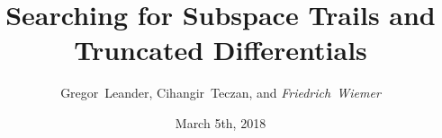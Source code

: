\documentclass[%
    10pt,
    professionalfont,
]{beamer}
\title{Searching for Subspace Trails and \\Truncated Differentials}
\subtitle{}
\author[Friedrich~Wiemer]{Gregor~Leander, Cihangir~Teczan, and \emph{Friedrich~Wiemer}}
\institute{%
    Horst Görtz Institute for IT Security\\
    Ruhr-Universität Bochum
}
\date{March 5th, 2018}
\begin{document}
\begin{frame}
    \titlepage{}
\end{frame}


\end{document}
